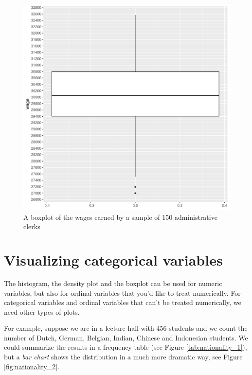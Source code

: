 \documentclass[]{report}\usepackage[]{graphicx}\usepackage[]{color}
\makeatletter
\def\maxwidth{ %
  \ifdim\Gin@nat@width>\linewidth
    \linewidth
  \else
    \Gin@nat@width
  \fi
}
\newenvironment{knitrout}{}{} %
\makeatother
\begin{document}
\begin{knitrout}
\color{fgcolor}\begin{figure}

{\centering \includegraphics[width=\maxwidth]{figure/chis_7-1} 

}

\caption[A boxplot of the wages earned by a sample of 150 administrative clerks]{A boxplot of the wages earned by a sample of 150 administrative clerks}\label{fig:chis_7}
\end{figure}


\end{knitrout}




\section{Visualizing categorical variables}

The histogram, the density plot and the boxplot can be used for numeric variables, but also for ordinal variables that you'd like to treat numerically. For categorical variables and ordinal variables that can't be treated numerically, we need other types of plots.

For example, suppose we are in a lecture hall with 456 students and we count the number of Dutch, German, Belgian, Indian, Chinese and Indonesian students. We could summarize the results in a frequency table (see Figure \ref{tab:nationality_1}), but a \textit{bar chart} shows the distribution in a much more dramatic way, see Figure \ref{fig:nationality_2}.
\end{document}

